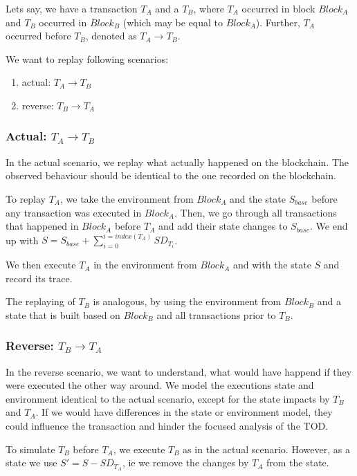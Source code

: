 \documentclass[draft,final]{vutinfth} %
\begin{document}
Lets say, we have a transaction $T_A$ and a $T_B$, where $T_A$ occurred in block $Block_A$ and $T_B$ occurred in $Block_B$ (which may be equal to $Block_A$). Further, $T_A$ occurred before $T_B$, denoted as $T_A \rightarrow T_B$.

We want to replay following scenarios:

\begin{enumerate}
    \item actual: $T_A \rightarrow T_B$
    \item reverse: $T_B \rightarrow T_A$
\end{enumerate}

\subsubsection{Actual: $T_A \rightarrow T_B$}
In the actual scenario, we replay what actually happened on the blockchain. The observed behaviour should be identical to the one recorded on the blockchain.

To replay $T_A$, we take the environment from $Block_A$ and the state $S_{base}$ before any transaction was executed in $Block_A$. Then, we go through all transactions that happened in $Block_A$ before $T_A$ and add their state changes to $S_{base}$. We end up with $S = S_{base} + \sum_{i=0}^{i=index(T_A)}SD_{T_i}$.

We then execute $T_A$ in the environment from $Block_A$ and with the state $S$ and record its trace.

The replaying of $T_B$ is analogous, by using the environment from $Block_B$ and a state that is built based on $Block_B$ and all transactions prior to $T_B$.

\subsubsection{Reverse: $T_B \rightarrow T_A$}

In the reverse scenario, we want to understand, what would have happend if they were executed the other way around. We model the executions state and environment identical to the actual scenario, except for the state impacts by $T_B$ and $T_A$. If we would have differences in the state or environment model, they could influence the transaction and hinder the focused analysis of the TOD.

To simulate $T_B$ before $T_A$, we execute $T_B$ as in the actual scenario. However, as a state we use $S\prime = S - SD_{T_A}$, ie we remove the changes by $T_A$ from the state.
\end{document}

